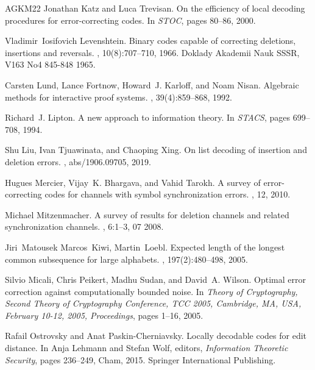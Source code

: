 \documentclass[10pt,a4paper]{article}
\theoremstyle{remark}
\begin{document}
\begin{thebibliography}{AGKM22}
Jonathan Katz and Luca Trevisan.
\newblock On the efficiency of local decoding procedures for error-correcting
  codes.
\newblock In {\em {STOC}}, pages 80--86, 2000.

Vladimir~Iosifovich Levenshtein.
\newblock Binary codes capable of correcting deletions, insertions and
  reversals.
, 10(8):707--710, 1966.
\newblock Doklady Akademii Nauk SSSR, V163 No4 845-848 1965.

Carsten Lund, Lance Fortnow, Howard~J. Karloff, and Noam Nisan.
\newblock Algebraic methods for interactive proof systems.
, 39(4):859--868, 1992.

Richard~J. Lipton.
\newblock A new approach to information theory.
\newblock In {\em {STACS}}, pages 699--708, 1994.

Shu Liu, Ivan Tjuawinata, and Chaoping Xing.
\newblock On list decoding of insertion and deletion errors.
, abs/1906.09705, 2019.

Hugues Mercier, Vijay~K. Bhargava, and Vahid Tarokh.
\newblock A survey of error-correcting codes for channels with symbol
  synchronization errors.
, 12, 2010.

Michael Mitzenmacher.
\newblock A survey of results for deletion channels and related synchronization
  channels.
, 6:1--3, 07 2008.

Jiri~Matousek Marcos~Kiwi, Martin~Loebl.
\newblock Expected length of the longest common subsequence for large
  alphabets.
, 197(2):480--498, 2005.

Silvio Micali, Chris Peikert, Madhu Sudan, and David~A. Wilson.
\newblock Optimal error correction against computationally bounded noise.
\newblock In {\em Theory of Cryptography, Second Theory of Cryptography
  Conference, {TCC} 2005, Cambridge, MA, USA, February 10-12, 2005,
  Proceedings}, pages 1--16, 2005.

Rafail Ostrovsky and Anat Paskin-Cherniavsky.
\newblock Locally decodable codes for edit distance.
\newblock In Anja Lehmann and Stefan Wolf, editors, {\em Information Theoretic
  Security}, pages 236--249, Cham, 2015. Springer International Publishing.


\end{thebibliography}
\end{document}
